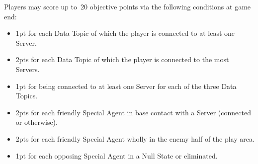 Players may score up to~20 objective points via the following
conditions at game end:
\begin{itemize}\shortlist
\item   1pt for each Data Topic of which the player is connected to at least one Server.
\item 2pts for each Data Topic of which the player is connected to the most Servers.
\item   1pt for being connected to at least one Server for each of the three Data Topics.

\item 2pts for each friendly Special Agent in base contact with a
  Server (connected or otherwise).
\item 2pts for each friendly Special Agent wholly in the enemy half of the
  play area.
\item 1pt for each opposing Special Agent in a Null State or eliminated.

\end{itemize}
